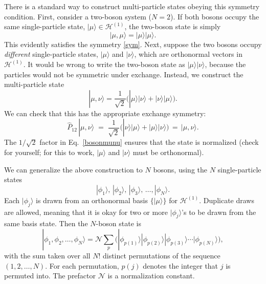 \documentclass[prx,12pt]{revtex4-2}
\begin{document}
There is a standard way to construct multi-particle states obeying
this symmetry condition.  First, consider a two-boson system ($N =
2$).  If both bosons occupy the same single-particle state,
$|\mu\rangle \in \mathscr{H}^{(1)}$, the two-boson state is simply
\begin{equation}
  |\mu,\mu\rangle = |\mu\rangle  |\mu\rangle.
  \label{mumu}
\end{equation}
This evidently satisfies the symmetry \eqref{sym}.  Next, suppose the
two bosons occupy \textit{different} single-particle states,
$|\mu\rangle$ and $|\nu\rangle$, which are orthonormal vectors in
$\mathscr{H}^{(1)}$.  It would be wrong to write the two-boson state
as $|\mu\rangle |\nu\rangle$, because the particles would not be
symmetric under exchange.  Instead, we construct the multi-particle
state
\begin{equation}
  |\mu,\nu\rangle = \frac{1}{\sqrt{2}} \Big( |\mu\rangle |\nu\rangle +
  |\nu\rangle |\mu\rangle\Big).
  \label{bosonmunu}
\end{equation}
We can check that this has the appropriate exchange symmetry:
\begin{equation}
  \hat{P}_{12}\,|\mu,\nu\rangle \;=\; \frac{1}{\sqrt{2}}
  \Big( |\nu\rangle  |\mu\rangle + |\mu\rangle  |\nu\rangle\Big)
  \,=\, |\mu, \nu\rangle.
\end{equation}
The $1/\sqrt{2}$ factor in Eq.~\eqref{bosonmunu} ensures that the
state is normalized (check for yourself; for this to work,
$|\mu\rangle$ and $|\nu\rangle$ must be orthonormal).

We can generalize the above construction to $N$ bosons, using the $N$
single-particle states
\begin{equation}
  |\phi_1\rangle, \, |\phi_2\rangle, \, |\phi_3\rangle, \, \dots, |\phi_N\rangle.
\end{equation}
Each $|\phi_j\rangle$ is drawn from an orthonormal basis
$\{|\mu\rangle\}$ for $\mathscr{H}^{(1)}$.  Duplicate draws are
allowed, meaning that it is okay for two or more $|\phi_j\rangle$'s to
be drawn from the same basis state.  Then the $N$-boson state is
\begin{equation}
  |\phi_1,\phi_2,\dots,\phi_N\rangle = \mathcal{N} \sum_p
  \Big(|\phi_{p(1)}\rangle  |\phi_{p(2)}\rangle  |\phi_{p(3)}\rangle  \cdots
  |\phi_{p(N)}\rangle\Big),
  \label{nbosons}
\end{equation}
with the sum taken over all $N!$ distinct permutations of the sequence
$(1,2,\dots,N)$.  For each permutation, $p(j)$ denotes the integer
that $j$ is permuted into.  The prefactor $\mathcal{N}$ is a
normalization constant.
\end{document}
